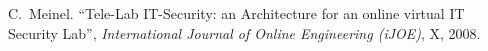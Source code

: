 \documentclass[a4paper,12pt,headsepline,pagesize,bibtotoc,titlepage]{scrartcl}
\begin{document}
%
%
%
%


\newpage
\begin{thebibliography}{1}

C.~Meinel.
``Tele-Lab IT-Security: an Architecture for an online virtual IT Security Lab'',
\emph{International Journal of Online Engineering (iJOE)},
X, 2008.

\end{thebibliography}
\end{document}
